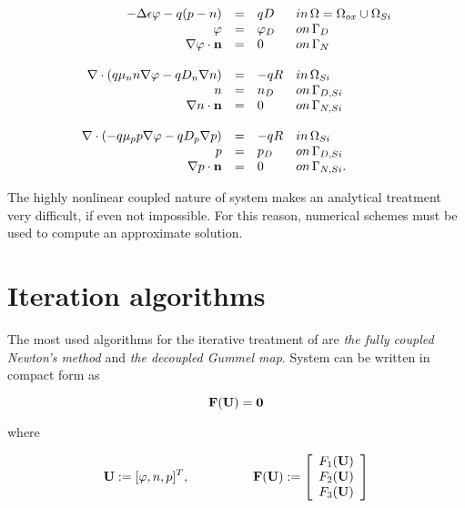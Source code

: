 \begin{equation}
\label{eq: system closed}
\begin{array}{rcll}
- \Delta \epsilon \varphi - q(p-n) & =  & qD & in \, \Omega = \Omega_{ox} \cup \Omega_{Si}\\
\varphi & = & \varphi_D & on \, \Gamma_D \\
\nabla \varphi \cdot \mathbf{n} & = & 0 & on \, \Gamma_N 
\\
\\
\nabla \cdot ( q\mu_n n \nabla \varphi - qD_n \nabla n ) & = & - qR & in \, \Omega_{Si}\\
n & = & n_D & on \, \Gamma_{D,Si} \\
\nabla n \cdot \mathbf{n} & = & 0 & on \, \Gamma_{N,Si}
\\
\\
\nabla \cdot (- q\mu_p p \nabla \varphi - qD_p \nabla p )& = & -qR& in \, \Omega_{Si}\\
p & = & p_D & on \, \Gamma_{D,Si} \\
\nabla p \cdot \mathbf{n} & = & 0 & on \, \Gamma_{N,Si}.
\end{array}
\end{equation}

The highly nonlinear coupled nature of system	 makes an analytical treatment very difficult, if even not impossible. For this reason, numerical schemes must be used to  compute an approximate solution. 


\section{Iteration algorithms}

 The most used algorithms for the iterative treatment of  are \textit{the fully coupled Newton's method} and \textit{the decoupled Gummel map}. System  can be written in compact form as

\begin{equation}
\label{eq: abstract problem fully}
\mathbf{F(U)}=\mathbf{0}
\end{equation}

where

\begin{equation}
\label{eq: functional operator}
\vect{U}:=[\varphi,n,p]^T, \psp{30} \vect{F(U)}:=\left[ \begin{array}{c}
F_1(\vect{U}) \\
F_2(\vect{U}) \\
F_3(\vect{U})
\end{array}
\right]
\end{equation}

